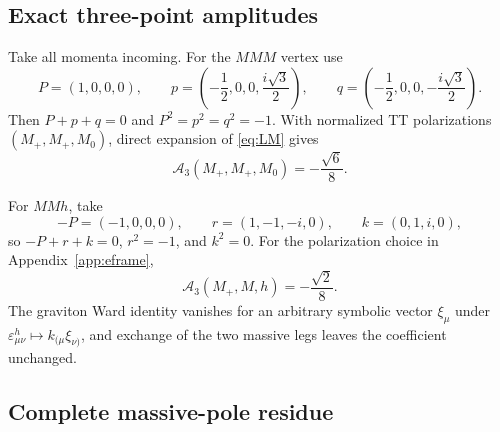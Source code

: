 \documentclass[11pt]{article}
\theoremstyle{definition}
\theoremstyle{remark}
\begin{document}
\subsection{Exact three-point amplitudes}

Take all momenta incoming.  For the $MMM$ vertex use
\begin{equation}\label{eq:mmmkin}
P=(1,0,0,0),\qquad
p=\left(-\frac12,0,0,\frac{i\sqrt3}{2}\right),\qquad
q=\left(-\frac12,0,0,-\frac{i\sqrt3}{2}\right).
\end{equation}
Then $P+p+q=0$ and $P^2=p^2=q^2=-1$.  With normalized TT
polarizations $(M_+,M_+,M_0)$, direct expansion of \eqref{eq:LM} gives
\begin{equation}\label{eq:mmmvalue}
\boxed{\mathcal A_3(M_+,M_+,M_0)=-\frac{\sqrt6}{8}.}
\end{equation}

For $MMh$, take
\begin{equation}\label{eq:mmhkin}
-P=(-1,0,0,0),\qquad
r=(1,-1,-i,0),\qquad
k=(0,1,i,0),
\end{equation}
so $-P+r+k=0$, $r^2=-1$, and $k^2=0$.  For the polarization choice in
Appendix~\ref{app:eframe},
\begin{equation}\label{eq:mmhvalue}
\boxed{\mathcal A_3(M_+,M,h)=-\frac{\sqrt2}{8}.}
\end{equation}
The graviton Ward identity vanishes for an arbitrary symbolic vector
$\xi_\mu$ under
$\varepsilon^h_{\mu\nu}\mapsto k_{(\mu}\xi_{\nu)}$, and exchange of
the two massive legs leaves the coefficient unchanged.

\subsection{Complete massive-pole residue}
\end{document}
